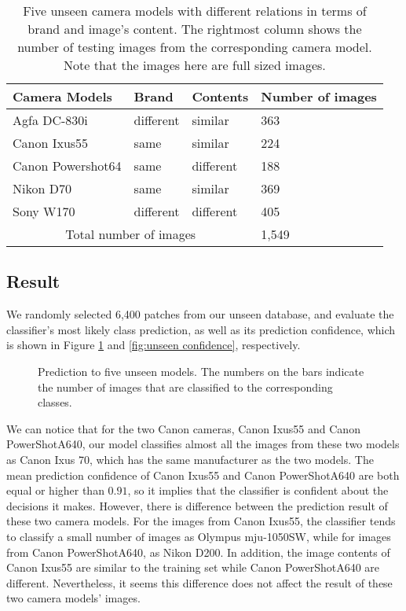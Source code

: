 \documentclass[a4paper, 9pt, twocolumn]{extarticle}
\begin{document}
\begin{table}
	\center
	\begin{tabular}{ |p{2.8cm}|p{1.1cm}|p{1.2cm}|p{1.6cm}| }
		\hline
		Camera Models & Brand & Contents & Number of images\\
		\hline
		Agfa DC-830i & different & similar & 363 \\
		Canon Ixus55 & same & similar & 224 \\
		Canon Powershot64 & same & different & 188 \\
		Nikon D70 & same & similar & 369 \\
		Sony W170 & different & different & 405 \\
		\hline
		\multicolumn{3}{|c|}{Total number of images} & 1,549 \\
		\hline
	\end{tabular}
	\caption{\label{tab:makes} Five unseen camera models with different relations in terms of brand and image's content. The rightmost column shows the number of testing images from the corresponding camera model. Note that the images here are full sized images.}
\end{table}

\subsection*{Result}
\label{section:unseen result}

We randomly selected 6,400 patches from our unseen database, and evaluate the classifier's most likely class prediction, as well as its prediction confidence, which is shown in Figure \ref{fig:unseen result} and \ref{fig:unseen confidence}, respectively. 

\begin{figure}
	\centering
	\resizebox{!}{!}{
		{}
	}
	\caption{Prediction to five unseen models. The numbers on the bars indicate the number of images that are classified to the corresponding classes.}
	\label{fig:unseen result}
\end{figure} 

We can notice that for the two Canon cameras, Canon Ixus55 and Canon PowerShotA640, our model classifies almost all the images from these two models as Canon Ixus 70, which has the same manufacturer as the two models. The mean prediction confidence of Canon Ixus55 and Canon PowerShotA640 are both equal or higher than $ 0.91 $, so it implies that the classifier is confident about the decisions it makes. However, there is difference between the prediction result of these two camera models. For the images from Canon Ixus55, the classifier tends to classify a small number of images as Olympus mju-1050SW, while for images from Canon PowerShotA640, as Nikon D200. In addition, the image contents of Canon Ixus55 are similar to the training set while Canon PowerShotA640 are different. Nevertheless, it seems this difference does not affect the result of these two camera models' images.
\end{document}
